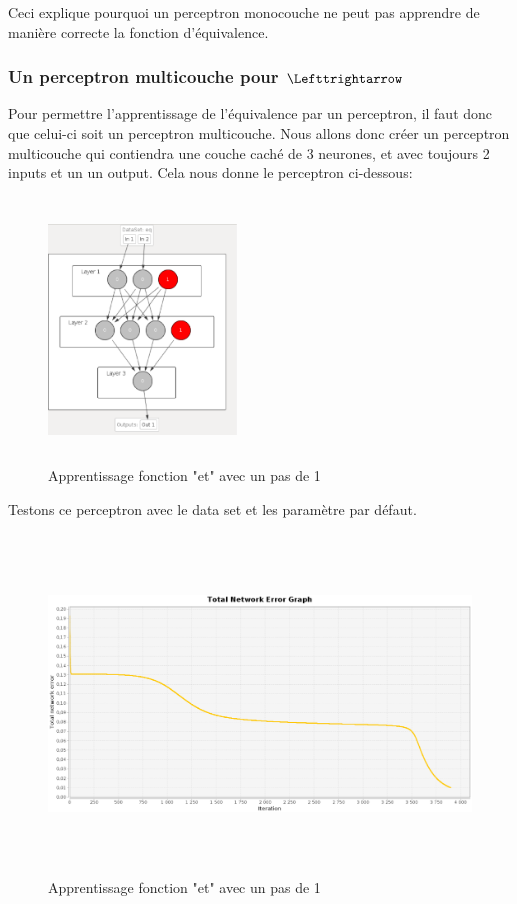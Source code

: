 \documentclass[twoside,openright,a4paper,11pt,french]{article}
\begin{document}

Ceci explique pourquoi un perceptron monocouche ne peut pas apprendre de manière correcte
la fonction d'équivalence.

\subsubsection{Un perceptron multicouche pour $\Lefttrightarrow$}

Pour permettre l'apprentissage de l'équivalence par un perceptron, il faut donc que
celui-ci soit un perceptron multicouche.
Nous allons donc créer un perceptron multicouche qui contiendra une couche caché de
3 neurones, et avec toujours 2 inputs et un un output.
Cela nous donne le perceptron ci-dessous:

\begin{figure}[h]
\centering
\includegraphics[width=5cm,height=7cm]{./pics/eq/perceptron_multi.eps}
\caption{Apprentissage fonction "et" avec un pas de 1}
\label{fig:anderr4}
\end{figure}

Testons ce perceptron avec le data set et les paramètre par défaut.

\begin{figure}[h]
\centering
\includegraphics[width=12cm,height=9cm]{./pics/eq/multi_eq_def.eps}
\caption{Apprentissage fonction "et" avec un pas de 1}
\label{fig:anderr4}
\end{figure}
\end{document}
